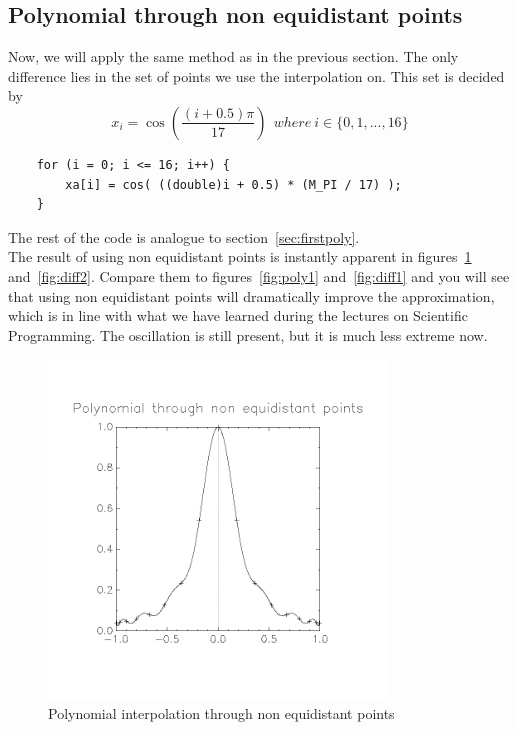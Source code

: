 \documentclass[11pt, a4paper, titlepage, openright]{article}
\begin{document}
\subsection{Polynomial through non equidistant points}
    Now, we will apply the same method as in the previous section. The only difference lies in the set of points we use
    the interpolation on. This set is decided by \[x_i = \cos(\frac{(i + 0.5) \pi}{17}) \ \ where \ i \in \{0, 1, ..., 16\} \]
    \begin{lstlisting}
    for (i = 0; i <= 16; i++) {
        xa[i] = cos( ((double)i + 0.5) * (M_PI / 17) );
    }
    \end{lstlisting}
    The rest of the code is analogue to section~\ref{sec:firstpoly}. \\
    The result of using non equidistant points is instantly apparent in figures~\ref{fig:poly2} and~\ref{fig:diff2}.
    Compare them to figures~\ref{fig:poly1} and~\ref{fig:diff1} and you will see that using non equidistant points will
    dramatically improve the approximation, which is in line with what we have learned during the lectures on Scientific
    Programming. The oscillation is still present, but it is much less extreme now.
    \begin{figure}[H]
        \centering
        \includegraphics[width=9cm, trim={2cm, 4cm, 2cm, 3cm}, clip]{../images/poly2}
        \caption{Polynomial interpolation through non equidistant points}
        \label{fig:poly2}
    \end{figure}
\end{document}
